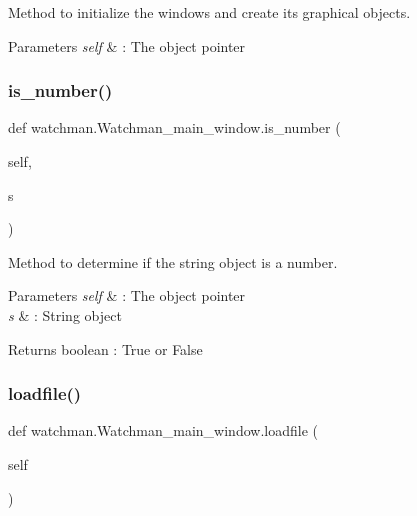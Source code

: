 Method to initialize the windows and create its graphical objects. 


\begin{DoxyParams}{Parameters}
{\em self} & \+: The object pointer \\
\hline
\end{DoxyParams}
\mbox{\label{classwatchman_1_1_watchman__main__window_ab13d784cf818f892727af9b2caa1c7fb}} 
\subsubsection{\texorpdfstring{is\_number()}{is\_number()}}
{\footnotesize\ttfamily def watchman.\+Watchman\+\_\+main\+\_\+window.\+is\+\_\+number (\begin{DoxyParamCaption}\item[{}]{self,  }\item[{}]{s }\end{DoxyParamCaption})}



Method to determine if the string object is a number. 


\begin{DoxyParams}{Parameters}
{\em self} & \+: The object pointer \\
\hline
{\em s} & \+: String object \\
\hline
\end{DoxyParams}
\begin{DoxyReturn}{Returns}
boolean \+: True or False 
\end{DoxyReturn}
\mbox{\label{classwatchman_1_1_watchman__main__window_aabb93204515ee2a01c81d9a2dd846a89}} 
\subsubsection{\texorpdfstring{loadfile()}{loadfile()}}
{\footnotesize\ttfamily def watchman.\+Watchman\+\_\+main\+\_\+window.\+loadfile (\begin{DoxyParamCaption}\item[{}]{self }\end{DoxyParamCaption})}



